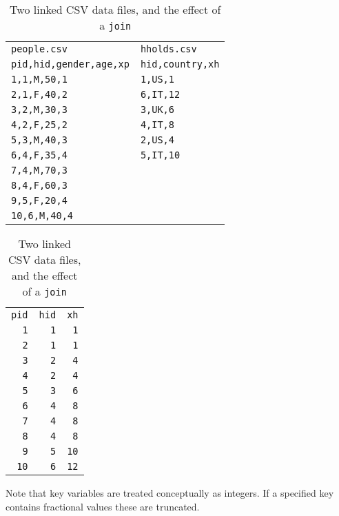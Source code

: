 \begin{table}[thbp]
\begin{center}
\setlength{\tabcolsep}{4em}
\begin{tabular}{ll}
\texttt{people.csv} & \texttt{hholds.csv} \\[6pt]
\texttt{pid,hid,gender,age,xp} & \texttt{hid,country,xh} \\
\texttt{1,1,M,50,1} & \texttt{1,US,1} \\
\texttt{2,1,F,40,2} & \texttt{6,IT,12} \\
\texttt{3,2,M,30,3} & \texttt{3,UK,6} \\
\texttt{4,2,F,25,2} & \texttt{4,IT,8} \\
\texttt{5,3,M,40,3} & \texttt{2,US,4} \\
\texttt{6,4,F,35,4} & \texttt{5,IT,10} \\
\texttt{7,4,M,70,3} \\
\texttt{8,4,F,60,3} \\
\texttt{9,5,F,20,4} \\
\texttt{10,6,M,40,4}
\end{tabular}

\vspace{1em}

\begin{tabular}{rrr}
  \texttt{pid}  & \texttt{hid}   &  \texttt{xh} \\[6pt]
    \texttt{1}  &  \texttt{1}    &   \texttt{1} \\
    \texttt{2}  &  \texttt{1}    &   \texttt{1} \\
    \texttt{3}  &  \texttt{2}    &   \texttt{4} \\
    \texttt{4}  &  \texttt{2}    &   \texttt{4} \\
    \texttt{5}  &  \texttt{3}    &   \texttt{6} \\
    \texttt{6}  &  \texttt{4}    &   \texttt{8} \\
    \texttt{7}  &  \texttt{4}    &   \texttt{8} \\
    \texttt{8}  &  \texttt{4}    &   \texttt{8} \\
    \texttt{9}  &  \texttt{5}    &  \texttt{10} \\
   \texttt{10}  &  \texttt{6}    &  \texttt{12}
\end{tabular}
\caption{Two linked CSV data files, and the effect of a \texttt{join}}
\label{tab:join-csv}
\end{center}
\end{table}

Note that key variables are treated conceptually as integers. If a
specified key contains fractional values these are truncated.

